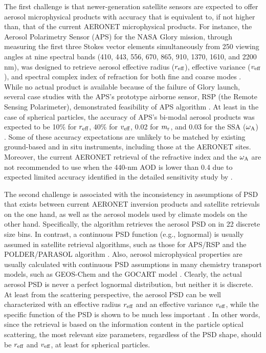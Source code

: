 The first challenge is that newer-generation satellite sensors are expected to
offer aerosol microphysical products with accuracy that is equivalent to, if
not higher than, that of the current AERONET microphysical products. For
instance, the Aerosol Polarimetry Sensor (APS) for the NASA Glory mission,
through measuring the first three Stokes vector elements simultaneously from
250 viewing angles at nine spectral bands (410, 443, 556, 670, 865, 910, 1370,
1610, and 2200 nm), was designed to retrieve aerosol effective radius ($r_\text{eff}$),
effective variance ($v_\text{eff}$), and spectral complex index of refraction for both
fine and coarse modes \citep{Mishchenko07}. While no actual product is
available because of the failure of Glory launch, several case studies with the
APS’s prototype airborne sensor, RSP (the Remote Sensing Polarimeter),
demonstrated feasibility of APS algorithm \citep{Chowdhary02,Chowdhary05,
Mishchenko04,Waquet09}. At least in the case of
spherical particles, the accuracy of APS’s bi-modal aerosol products was
expected to be 10\% for $r_\text{eff}$, 40\% for $v_\text{eff}$, 0.02 for $m_\text{r}$, and 0.03 for the SSA
($\omega_\text{A}$) \citep{Mishchenko07}. Some of these accuracy expectations are
unlikely to be matched by existing ground-based and in situ instruments,
including those at the AERONET sites. Moreover, the current AERONET retrieval
of the refractive index and the $\omega_\text{A}$ are not recommended to use when the 440-nm
AOD is lower than 0.4 \citep{Holben06} due to expected limited accuracy
identified in the detailed sensitivity study by \citep{Dubovik00b}.

The second challenge is associated with the inconsistency in assumptions of PSD
that exists between current AERONET inversion products and satellite retrievals
on the one hand, as well as the aerosol models used by climate models on the
other hand. Specifically, the \Dub algorithm retrieves the aerosol PSD
on in 22 discrete size bins. In contrast, a continuous PSD function (e.g.,
lognormal) is usually assumed in satellite retrieval algorithms, such as those
for APS/RSP \citep{Mishchenko07, Waquet09} and the
POLDER/PARASOL algorithm \citep{Hasekamp11}. Also, aerosol microphysical
properties are usually calculated with continuous PSD assumptions in many
chemistry transport models, such as GEOS-Chem \citep{Drury10, Wang10}
and the GOCART model \citep{Chin02}. Clearly, the actual aerosol PSD
is never a perfect lognormal distribution, but neither it is discrete. At least
from the scattering perspective, the aerosol PSD can be well characterized with
an effective radius $r_\text{eff}$ and an effective variance $v_\text{eff}$, while the specific
function of the PSD is shown to be much less important \citep{Hansen74}.
In other words, since the retrieval is based on the information content
in the particle optical scattering, the most relevant size parameters,
regardless of the PSD shape, should be $r_\text{eff}$ and $v_\text{eff}$, at least for spherical
particles.

